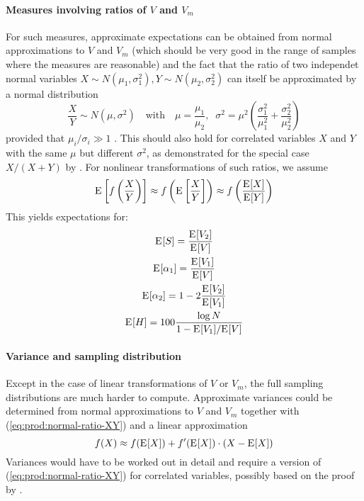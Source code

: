 \documentclass[a4paper]{article}
\begin{document}
\paragraph{Measures involving ratios of $V$ and $V_m$}
For such measures, approximate expectations can be obtained from normal
approximations to $V$ and $V_m$ (which should be very good in the range of
samples where the measures are reasonable) and the fact that the ratio of two
independet normal variables
$X\sim N(\mu_1, \sigma_1^2), Y\sim N(\mu_2, \sigma_2^2)$ can itself be
approximated by a normal distribution
\begin{equation}
  \label{eq:prod:normal-ratio-XY}
  \frac{X}{Y} \sim N(\mu, \sigma^2)
  \quad\text{with}\quad
  \mu = \frac{\mu_1}{\mu_2},\;\;
  \sigma^2 = \mu^2 \left( \frac{\sigma_1^2}{\mu_1^2} + \frac{\sigma_2^2}{\mu_2^2} \right)
\end{equation}
provided that $\mu_i / \sigma_i \gg 1$ \citep[313]{DiazFrances:Rubio:13}.
This should also hold for correlated variables $X$ and $Y$ with the same $\mu$
but different $\sigma^2$, as demonstrated for the special case $X / (X+Y)$ by
\citet[Lemma A.8]{Evert:04phd}.  For nonlinear transformations of such ratios,
we assume
\begin{equation}
  \mathrm{E}_{}\left[ f\left( \frac{X}{Y} \right) \right]
  \approx f\left( \mathrm{E}_{}\left[\frac{X}{Y}\right] \right)
  \approx f\left( \frac{\mathrm{E}_{}[X]}{\mathrm{E}_{}[Y]} \right)
\end{equation}
This yields expectations for:
\begin{gather}
  \mathrm{E}_{}[S] = \frac{\mathrm{E}_{}[V_2]}{\mathrm{E}_{}[V]} \\
  \mathrm{E}_{}[\alpha_1] = \frac{\mathrm{E}_{}[V_1]}{\mathrm{E}_{}[V]} \\
  \mathrm{E}_{}[\alpha_2] = 1 - 2 \frac{\mathrm{E}_{}[V_2]}{\mathrm{E}_{}[V_1]} \\
  \mathrm{E}_{}[H] = 100 \frac{\log N}{1 - \mathrm{E}_{}[V_1] / \mathrm{E}_{}[V]}
\end{gather}

\paragraph{Variance and sampling distribution}
Except in the case of linear transformations of $V$ or $V_m$, the full
sampling distributions are much harder to compute.  Approximate variances
could be determined from normal approximations to $V$ and $V_m$ together with
(\ref{eq:prod:normal-ratio-XY}) and a linear approximation
\[
  f(X) \approx f(\mathrm{E}_{}[X]) + f'(\mathrm{E}_{}[X])\cdot (X - \mathrm{E}_{}[X])
\]
Variances would have to be worked out in detail and require a version of
(\ref{eq:prod:normal-ratio-XY}) for correlated variables, possibly based
on the proof by \citet[Lemma A.8]{Evert:04phd}.
\end{document}
